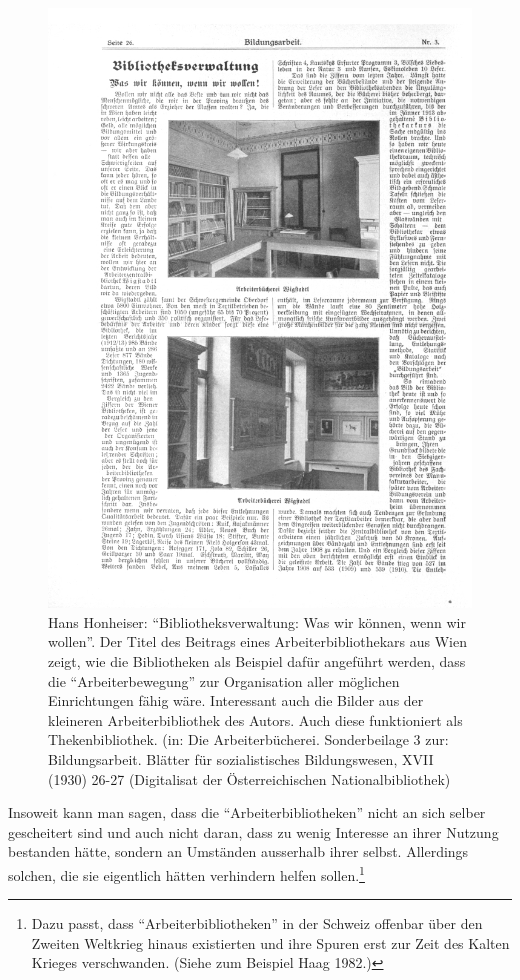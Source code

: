 \documentclass[a4paper,
fontsize=11pt,
oneside,
numbers=noperiodatend,
parskip=half-,
bibliography=totoc,
final
]{scrartcl}
\begin{document}
\begin{figure}
\centering
\includegraphics[width=13.1 cm]{img/Schuldt06.jpg}
\caption{Hans Honheiser: \enquote{Bibliotheksverwaltung: Was wir können,
wenn wir wollen}. Der Titel des Beitrags eines Arbeiterbibliothekars aus
Wien zeigt, wie die Bibliotheken als Beispiel dafür angeführt werden,
dass die \enquote{Arbeiterbewegung} zur Organisation aller möglichen
Einrichtungen fähig wäre. Interessant auch die Bilder aus der kleineren
Arbeiterbibliothek des Autors. Auch diese funktioniert als
Thekenbibliothek. (in: Die Arbeiterbücherei. Sonderbeilage 3 zur:
Bildungsarbeit. Blätter für sozialistisches Bildungswesen, XVII (1930)
26-27 (Digitalisat der Österreichischen Nationalbibliothek)}
\end{figure}

Insoweit kann man sagen, dass die \enquote{Arbeiterbibliotheken} nicht
an sich selber gescheitert sind und auch nicht daran, dass zu wenig
Interesse an ihrer Nutzung bestanden hätte, sondern an Umständen
ausserhalb ihrer selbst. Allerdings solchen, die sie eigentlich hätten
verhindern helfen sollen.\footnote{Dazu passt, dass
  \enquote{Arbeiterbibliotheken} in der Schweiz offenbar über den
  Zweiten Weltkrieg hinaus existierten und ihre Spuren erst zur Zeit des
  Kalten Krieges verschwanden. (Siehe zum Beispiel Haag 1982.)}
\end{document}
